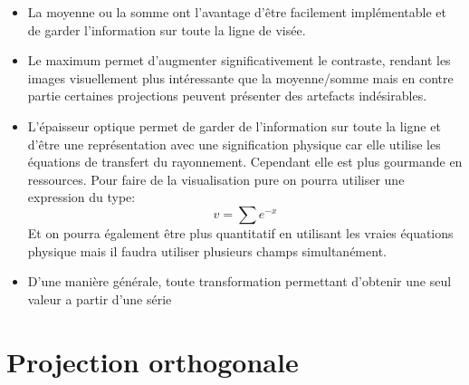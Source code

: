 \begin{itemize}
\item La moyenne ou la somme ont l'avantage d'être facilement implémentable et de garder l'information sur toute la ligne de visée.

\item Le maximum permet d'augmenter significativement le contraste, rendant les images visuellement plus intéressante que la moyenne/somme mais en contre partie certaines projections peuvent présenter des artefacts indésirables.

\item L'épaisseur optique permet de garder de l'information sur toute la ligne et d'être une représentation avec une signification physique car elle utilise les équations de transfert du rayonnement.
Cependant elle est plus gourmande en ressources.
Pour faire de la visualisation pure on pourra utiliser une expression du type:
\begin{equation}
v= \sum e^{-x}
\label{eq:epop}
\end{equation}
Et on pourra également être plus quantitatif en utilisant les vraies équations physique mais il faudra utiliser plusieurs champs simultanément. %

\item D'une manière générale, toute transformation permettant d'obtenir une seul valeur a partir d'une série

\end{itemize}




\section{Projection orthogonale}

